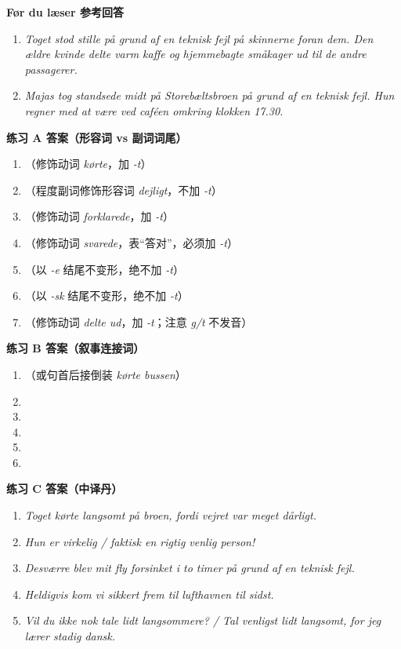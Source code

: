 \begin{answerbox}
\textbf{Før du læser 参考回答}
\begin{enumerate}
  \item \textit{Toget stod stille på grund af en teknisk fejl på skinnerne foran dem. Den ældre kvinde delte varm kaffe og hjemmebagte småkager ud til de andre passagerer.}
  \item \textit{Majas tog standsede midt på Storebæltsbroen på grund af en teknisk fejl. Hun regner med at være ved caféen omkring klokken 17.30.}
\end{enumerate}

\textbf{练习 A 答案（形容词 vs 副词词尾）}
\begin{enumerate}
  \item {}（修饰动词 \textit{kørte}，加 \textit{-t}）
  \item {}（程度副词修饰形容词 \textit{dejligt}，不加 \textit{-t}）
  \item {}（修饰动词 \textit{forklarede}，加 \textit{-t}）
  \item {}（修饰动词 \textit{svarede}，表“答对”，必须加 \textit{-t}）
  \item {}（以 \textit{-e} 结尾不变形，绝不加 \textit{-t}）
  \item {}（以 \textit{-sk} 结尾不变形，绝不加 \textit{-t}）
  \item {}（修饰动词 \textit{delte ud}，加 \textit{-t}；注意 \textit{g/t} 不发音）
\end{enumerate}

\textbf{练习 B 答案（叙事连接词）}
\begin{enumerate}
  \item {}（或句首后接倒装 \textit{kørte bussen}）
  \item {}
  \item {}
  \item {}
  \item {}
  \item {}
\end{enumerate}

\textbf{练习 C 答案（中译丹）}
\begin{enumerate}
  \item \textit{Toget kørte langsomt på broen, fordi vejret var meget dårligt.}
  \item \textit{Hun er virkelig / faktisk en rigtig venlig person!}
  \item \textit{Desværre blev mit fly forsinket i to timer på grund af en teknisk fejl.}
  \item \textit{Heldigvis kom vi sikkert frem til lufthavnen til sidst.}
  \item \textit{Vil du ikke nok tale lidt langsommere? / Tal venligst lidt langsomt, for jeg lærer stadig dansk.}
\end{enumerate}


\end{answerbox}
